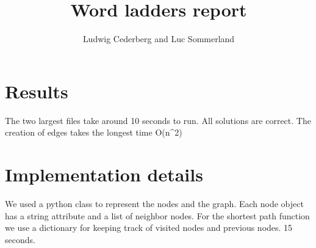 \documentclass{article}
\title{Word ladders report}
\author{Ludwig Cederberg and Luc Sommerland}
\begin{document}
  \maketitle

  \section{Results}

  The two largest files take around 10 seconds to run. 
  All solutions are correct.
  The creation of edges takes the longest time O(n^2)

  \section{Implementation details}

  We used a python class to represent the nodes and the graph. Each node object has a string attribute and a list of neighbor nodes. 
  For the shortest path function we use a dictionary for keeping track of visited nodes and previous nodes. 
  15 seconds.  
\end{document}
